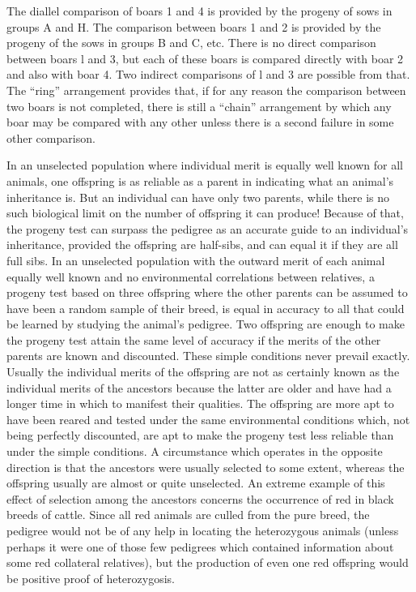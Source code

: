 \noindent
The diallel comparison of boars 1 and 4 is provided by the progeny of
sows in groups A and H. The comparison between boars 1 and 2 is provided
by the progeny of the sows in groups B and C, etc. There is no
direct comparison between boars l and 3, but each of these boars is compared
directly with boar 2 and also with boar 4. Two indirect
comparisons of l and 3 are possible from that. The ``ring'' arrangement
provides that, if for any reason the comparison between two boars is not
completed, there is still a ``chain'' arrangement by which any boar may
be compared with any other unless there is a second failure in some
other comparison.

In an unselected population where individual merit is equally well
known for all animals, one offspring is as reliable as a parent in indicating
what an animal's inheritance is. But an individual can have only
two parents, while there is no such biological limit on the number of
offspring it can produce! Because of that, the progeny test can surpass
the pedigree as an accurate guide to an individual's inheritance, provided
the offspring are half-sibs, and can equal it if they are all full sibs.
In an unselected population with the outward merit of each animal
equally well known and no environmental correlations between relatives,
a progeny test based on three offspring where the other parents
can be assumed to have been a random sample of their breed, is equal in
accuracy to all that could be learned by studying the animal's pedigree.
Two offspring are enough to make the progeny test attain the same level
of accuracy if the merits of the other parents are known and discounted.
These simple conditions never prevail exactly. Usually the individual
merits of the offspring are not as certainly known as the individual merits
of the ancestors because the latter are older and have had a longer
time in which to manifest their qualities. The offspring are more apt to
have been reared and tested under the same environmental conditions
which, not being perfectly discounted, are apt to make the progeny test
less reliable than under the simple conditions. A circumstance which
operates in the opposite direction is that the ancestors were usually
selected to some extent, whereas the offspring usually are almost or
quite unselected. An extreme example of this effect of selection among
the ancestors concerns the occurrence of red in black breeds of cattle.
Since all red animals are culled from the pure breed, the pedigree would
not be of any help in locating the heterozygous animals (unless perhaps
it were one of those few pedigrees which contained information about
some red collateral relatives), but the production of even one red offspring
would be positive proof of heterozygosis.

